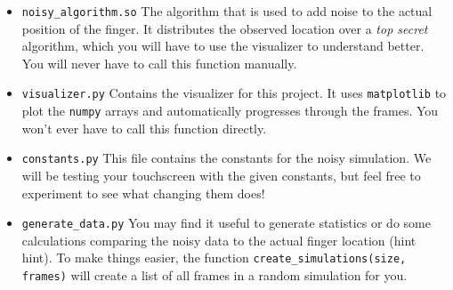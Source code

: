 \documentclass{article}
\begin{document}
\begin{itemize}
        \item \texttt{noisy\_algorithm.so} The algorithm that is used to add noise to the actual position of the finger. It distributes the observed location over a \textit{top secret} algorithm, which you will have to use the visualizer to understand better. You will never have to call this function manually.
        \item \texttt{visualizer.py} Contains the visualizer for this project. It uses \texttt{matplotlib} to plot the \texttt{numpy} arrays and automatically progresses through the frames. You won't ever have to call this function directly.
        \item \texttt{constants.py} This file contains the constants for the noisy simulation. We will be testing your touchscreen with the given constants, but feel free to experiment to see what changing them does!
        \item \texttt{generate\_data.py} You may find it useful to generate statistics or do some calculations comparing the noisy data to the actual finger location (hint hint). To make things easier, the function \texttt{create\_simulations(size, frames)} will create a list of all frames in a random simulation for you.
    \end{itemize}
    
\end{document}

